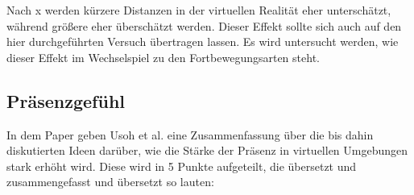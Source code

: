             Nach x werden kürzere Distanzen in der virtuellen Realität eher unterschätzt, während größere eher überschätzt werden. Dieser Effekt sollte sich auch auf den hier durchgeführten Versuch übertragen lassen. Es wird untersucht werden, wie dieser Effekt im Wechselspiel zu den Fortbewegungsarten steht.

        \subsection{Präsenzgefühl}
            In dem Paper \cite{presence-questionaire} geben Usoh et al. eine Zusammenfassung über die bis dahin diskutierten Ideen darüber, wie die Stärke der Präsenz in virtuellen Umgebungen stark erhöht wird. Diese wird in 5 Punkte aufgeteilt, die übersetzt und zusammengefasst und übersetzt so lauten:

